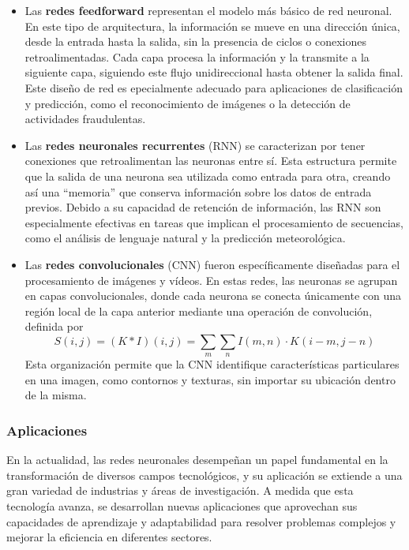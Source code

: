\begin{itemize}
    \item Las \textbf{redes feedforward} representan el modelo más básico de red neuronal. En este tipo de arquitectura, la información se mueve en una dirección única, desde la entrada hasta la salida, sin la presencia de ciclos o conexiones retroalimentadas. Cada capa procesa la información y la transmite a la siguiente capa, siguiendo este flujo unidireccional hasta obtener la salida final.
    Este diseño de red es epecialmente adecuado para aplicaciones de clasificación y predicción, como el reconocimiento de imágenes o la detección de actividades fraudulentas.
    \item Las \textbf{redes neuronales recurrentes} (RNN) se caracterizan por tener conexiones que retroalimentan las neuronas entre sí. Esta estructura permite que la salida de una neurona sea utilizada como entrada para otra, creando así una ``memoria'' que conserva información sobre los datos de entrada previos. 
    Debido a su capacidad de retención de información, las RNN son especialmente efectivas en tareas que implican el procesamiento de secuencias, como el análisis de lenguaje natural y la predicción meteorológica.

    \item Las \textbf{redes convolucionales} (CNN) fueron específicamente diseñadas para el procesamiento de imágenes y vídeos. En estas redes, las neuronas se agrupan en capas convolucionales, donde cada neurona se conecta únicamente con una región local de la capa anterior mediante una operación de convolución, definida por \begin{equation}
            S(i, j) = (K \ast I)(i, j) = \sum_{m}\sum_{n} I(m, n) \cdot K(i - m, j - n)
    \end{equation} Esta organización permite que la CNN identifique características particulares en una imagen, como contornos y texturas, sin importar su ubicación dentro de la misma.
\end{itemize}

\subsubsection{Aplicaciones}
En la actualidad, las redes neuronales desempeñan un papel fundamental en la transformación de diversos campos tecnológicos, y su aplicación se extiende a una gran variedad de industrias y áreas de investigación. A medida que esta tecnología avanza, se desarrollan nuevas aplicaciones que aprovechan sus capacidades de aprendizaje y adaptabilidad para resolver problemas complejos y mejorar la eficiencia en diferentes sectores.

